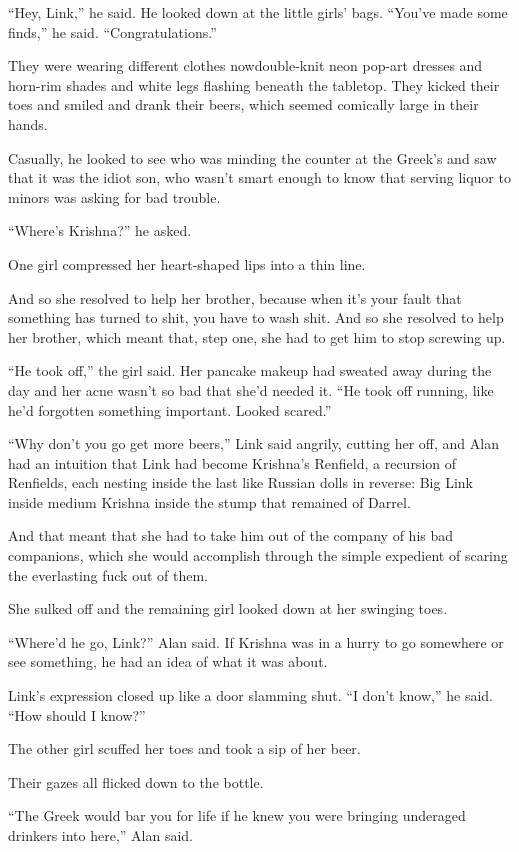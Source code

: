 ``Hey, Link,'' he said.  He looked down at the little girls' bags. 
``You've made some finds,'' he said.  ``Congratulations.''

They were wearing different clothes now\dash{}double-knit neon pop-art
dresses and horn-rim shades and white legs flashing beneath the
tabletop.  They kicked their toes and smiled and drank their beers,
which seemed comically large in their hands.

Casually, he looked to see who was minding the counter at the Greek's
and saw that it was the idiot son, who wasn't smart enough to know
that serving liquor to minors was asking for bad trouble.

``Where's Krishna?'' he asked.

One girl compressed her heart-shaped lips into a thin line.

And so she resolved to help her brother, because when it's your fault
that something has turned to shit, you have to wash shit.  And so she
resolved to help her brother, which meant that, step one, she had to
get him to stop screwing up.

``He took off,'' the girl said.  Her pancake makeup had sweated away
during the day and her acne wasn't so bad that she'd needed it.  ``He
took off running, like he'd forgotten something important.  Looked
scared.''

``Why don't you go get more beers,'' Link said angrily, cutting her
off, and Alan had an intuition that Link had become Krishna's
Renfield, a recursion of Renfields, each nesting inside the last like
Russian dolls in reverse:  Big Link inside medium Krishna inside the
stump that remained of Darrel.

And that meant that she had to take him out of the company of his bad
companions, which she would accomplish through the simple expedient of
scaring the everlasting fuck out of them.

She sulked off and the remaining girl looked down at her swinging
toes.

``Where'd he go, Link?'' Alan said.  If Krishna was in a hurry to go
somewhere or see something, he had an idea of what it was about.

Link's expression closed up like a door slamming shut.  ``I don't
know,'' he said.  ``How should I know?''

The other girl scuffed her toes and took a sip of her beer.

Their gazes all flicked down to the bottle.

``The Greek would bar you for life if he knew you were bringing
underaged drinkers into here,'' Alan said.

